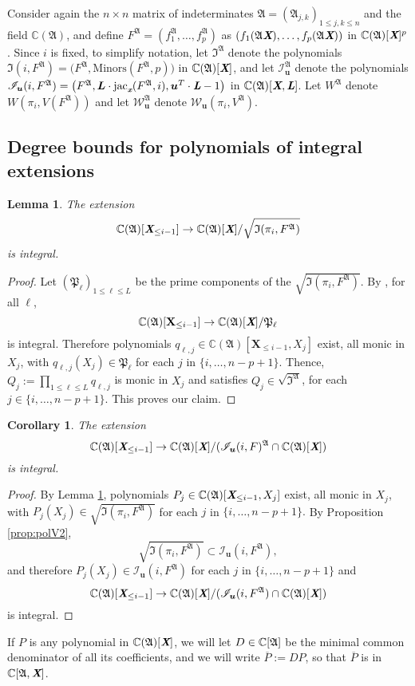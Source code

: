 \documentclass[a4paper]{article}
\def\fA{{\mathfrak A}}
\def\fp{\mathfrak{P}}
\def\A{\mathfrak{A}}
\def\Lb{\textit{\textbf{L}}}
\def\Xb{\textit{\textbf{X}}}
\def\ub{{\bm u}}
\def\xb{\textit{\textbf{x}}}
\DeclareMathOperator{\jac}{jac}
\def\minorsfA{\textrm{Minors}(F^{\A},p)}
\def\C{\mathbb{C}}
\def\I{\mathfrak{I}}
\def\IifAr{\sqrt{\mathfrak{I}(\pi_i,F^{\A})}}
\def\IifA{\mathfrak{I}(\pi_i,F^{\A})}
\def\Il{\mathscr{I}_{\ub}}
\def\Iil{\mathscr{I}_{\ub}(i,F)}
\def\IilfA{\mathscr{I}_{\ub}(i,F^{\A})}
\def\WilfA{\mathscr{W}_{\ub}(\pi_i,V^{\fA})}
\def\Wl{\mathscr{W}_{\ub}}
\newtheorem{corollary}[theorem]{Corollary}
\newtheorem{lemma}[theorem]{Lemma}
\begin{document}
Consider again the $n\times n$ matrix of indeterminates
$\A=(\A_{j,k})_{1 \le j,k \le n}$ and the field $\C(\A)$,
and define $F^{\A}=(f_1^{\A},\hdots,f_p^{\A})$  as $(f_1(\A\Xb),\hdots,f_p(\A\Xb))$ in $\C(\A)[\Xb]^p$.  Since $i$ is fixed, to
simplify notation, let $\I^\A$ denote the polynomials $\I(i,F^\A)= \big (F^\A, \minorsfA \big )$ in
$\C(\A)[\Xb]$, and let $\Il^\A$ denote the polynomials $\IilfA= \big (F^\A, \bm L \cdot \jac_{\xb}(F^\A,i),\ub^T\cdot\Lb-1 \big )$ in
$\C(\A)[\Xb,\Lb]$. Let $W^\A$ denote  $W(\pi_i,V(F^\A))$ and let $\Wl^\A$ denote  $\WilfA$. 




\subsection{Degree bounds for polynomials of integral extensions} 
%
\begin{lemma}\label{lem:6.1}
 The extension $$\C(\A)[\Xb_{\leq i-1}]\rightarrow
 \C(\A)[\Xb]/\IifAr$$ is integral.
\end{lemma}
%
\begin{proof}
  Let $(\fp_\ell)_{1 \le \ell \leq L}$ be the prime components of
  the $\IifAr$. By \cite[Proposition 1]{EMP}, for all
  $\ell$,
  \[
    \C(\A)[\textbf{X}_{\leq i-1}]\rightarrow\C(\A)[\Xb]/\fp_\ell
  \] 
  is integral. Therefore polynomials
  $q_{\ell,j}\in\C(\A)[\textbf{X}_{\leq i-1},X_j]$ exist, all monic in
  $X_j$, with $q_{\ell,j}(X_j)\in \fp_\ell$ for each $j$ in
  $\{i,\hdots,n-p+1\}.$ Thence, $ Q_{j} := \prod_{1 \le \ell\le L}
  q_{\ell,j}$ is monic in $X_j$ and satisfies $ Q_{j} \in \sqrt{\I^\A}$, for
  each $j \in \{i,\hdots,n-p+1\}.$ This proves our claim.
\end{proof}
%
\begin{corollary}\label{lem:6.2}
 The extension $$\C(\A)[\Xb_{\leq i-1}]\rightarrow
 \C(\A)[\Xb]/(\Iil^{\A} \cap \C(\A)[\Xb])$$ is integral.
\end{corollary}
%
\begin{proof}
By Lemma \ref{lem:6.1}, polynomials
  $P_{j}\in\C(\A)[\Xb_{\leq i-1},X_j]$ exist, all monic in
  $X_j$, with $P_{j}(X_j)\in \IifAr$ for each $j$ in
  $\{i,\hdots,n-p+1\}.$ By Proposition \ref{prop:polV2}, 
  \[
  \sqrt{\IifA} \subset \IilfA,
  \]
  and therefore $P_{j}(X_j)\in \IilfA$ for each $j$ in 
  $\{i,\hdots,n-p+1\}$ and 
  \[
  \C(\A)[\Xb_{\leq i-1}]\rightarrow
 \C(\A)[\Xb]/(\IilfA \cap \C(\A)[\Xb])
  \]
 is integral.
\end{proof}
%
If $P$ is any polynomial in $\C(\frak A)[\Xb]$, we will let
$D \in \C[\frak A]$ be the minimal common denominator of all its
coefficients, and we will write $\overline P := D P$, so that
$\overline P$ is in $\C[\A,\Xb]$.
\end{document}
